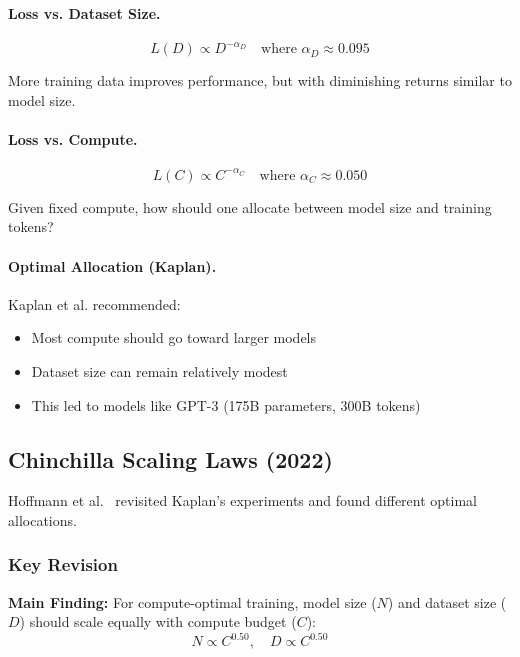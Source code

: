 \documentclass[class=article,crop=false]{standalone}
\begin{document}
\paragraph{Loss vs. Dataset Size.}
\begin{equation}
  L(D) \propto D^{-\alpha_D} \quad \text{where } \alpha_D \approx 0.095
\end{equation}

More training data improves performance, but with diminishing returns similar to model size.

\paragraph{Loss vs. Compute.}
\begin{equation}
  L(C) \propto C^{-\alpha_C} \quad \text{where } \alpha_C \approx 0.050
\end{equation}

Given fixed compute, how should one allocate between model size and training tokens?

\paragraph{Optimal Allocation (Kaplan).} Kaplan et al. recommended:
\begin{itemize}
  \item Most compute should go toward larger models
  \item Dataset size can remain relatively modest
  \item This led to models like GPT-3 (175B parameters, 300B tokens)
\end{itemize}

\subsection{Chinchilla Scaling Laws (2022)}
\label{sec:scaling:chinchilla}

Hoffmann et al.~\cite{hoffmann2022} revisited Kaplan's experiments and found different optimal allocations.

\subsubsection{Key Revision}

\textbf{Main Finding:} For compute-optimal training, model size ($N$) and dataset size ($D$) should scale equally with compute budget ($C$):
\begin{equation}
  N \propto C^{0.50}, \quad D \propto C^{0.50}
\end{equation}
\end{document}
